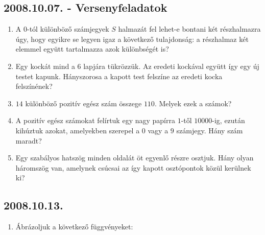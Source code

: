 \subsection*{2008.10.07. - Versenyfeladatok}
\begin{enumerate}
\item A $0$-tól különböző számjegyek $S$ halmazát fel lehet-e bontani két részhalmazra úgy, hogy egyikre se legyen igaz a következő tulajdonság: a részhalmaz két elemmel együtt tartalmazza azok különbségét is?
\item Egy kockát mind a $6$ lapjára tükrözzük. Az eredeti kockával együtt így egy új testet kapunk. Hányszorosa a kapott test felszíne az eredeti kocka felszínének?
\item $14$ különböző pozitív egész szám összege $110$. Melyek ezek a számok?
\item A pozitív egész számokat felírtuk egy nagy papírra $1$-től $10000$-ig, ezután kihúztuk azokat, amelyekben szerepel a $0$ vagy a $9$ számjegy. Hány szám maradt?
\item Egy szabályos hatszög minden oldalát öt egyenlő részre osztjuk. Hány olyan háromszög van, amelynek csúcsai az így kapott osztópontok közül kerülnek ki?
\end{enumerate}

\subsection*{2008.10.13.}
\begin{enumerate}
\item Ábrázoljuk a következő függvényeket:
\end{enumerate}


